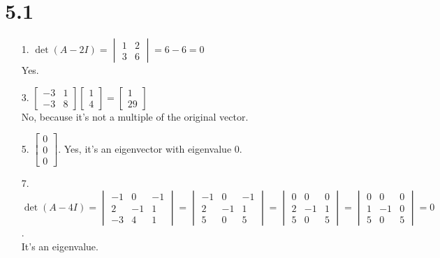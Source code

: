 \documentclass[leqno]{article}
\begin{document}
\section*{5.1}

\begin{enumerate}
    \item[1.] $\det(A - 2I) = \begin{vmatrix}1 & 2 \\ 3 & 6\end{vmatrix} = 6 - 6 = 0$\\
    Yes.
    \item[3.] $\begin{bmatrix}-3 & 1 \\ -3 & 8\end{bmatrix}\begin{bmatrix}1 \\ 4\end{bmatrix} = \begin{bmatrix}1 \\ 29\end{bmatrix}$\\
    No, because it's not a multiple of the original vector.
    \item[5.] $\begin{bmatrix}0 \\ 0 \\ 0\end{bmatrix}$. Yes, it's an eigenvector with eigenvalue 0.
    \item[7.] $\det(A - 4I) = \begin{vmatrix}-1 & 0 & -1 \\ 2 & -1 & 1 \\ -3 & 4 & 1\end{vmatrix} = \begin{vmatrix}-1 & 0 & -1 \\ 2 & -1 & 1 \\ 5 & 0 & 5\end{vmatrix} = \begin{vmatrix}0 & 0 & 0 \\ 2 & -1 & 1 \\ 5 & 0 & 5\end{vmatrix} = \begin{vmatrix}0 & 0 & 0 \\ 1 & -1 & 0 \\ 5 & 0 & 5\end{vmatrix} = 0$.\\
    It's an eigenvalue.\\

\end{enumerate}
\end{document}
